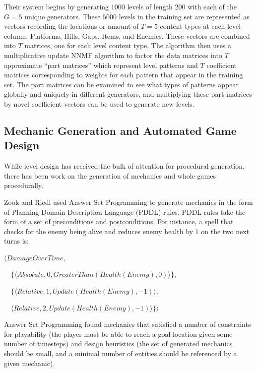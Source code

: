 \documentclass[a4paper]{article}
\begin{document}
Their system begins by generating $1000$ levels of length $200$ with each of the $G=5$ unique generators. These $5000$ levels in the training set are represented as vectors recording the locations or amount of $T=5$ content types at each level column: Platforms, Hills, Gaps, Items, and Enemies. These vectors are combined into $T$ matrices, one for each level content type.  The algorithm then uses a multiplicative update NNMF algorithm \cite{lee1999learning} to factor the data matrices into $T$ approximate ``part matrices'' which represent level patterns and $T$ coefficient matrices corresponding to weights for each pattern that appear in the training set.  The part matrices can be examined to see what types of patterns appear globally and uniquely in different generators, and multiplying these part matrices by novel coefficient vectors can be used to generate new levels. 

\subsection{Mechanic Generation and Automated Game Design}

While level design has received the bulk of attention for procedural generation, there has been work on the generation of mechanics and whole games procedurally.


Zook and Riedl \cite{AGDViaMechanics} used Answer Set Programming to generate mechanics in the form of Planning Domain Description Language (PDDL) rules.  PDDL rules take the form of a set of preconditions and postconditions.  For instance, a spell that checks for the enemy being
alive and reduces enemy health by 1 on the two next turns is:

$\langle DamageOverTime, $

$\quad \{\langle Absolute, 0, GreaterThan(Health(Enemy), 0)\rangle\}, $

$\quad \{\langle Relative, 1, Update(Health(Enemy), −1)\rangle, $

$ \quad  \langle Relative, 2,  Update(Health(Enemy),  −1)\rangle\}\rangle$

Answer Set Programming found mechanics that satisfied a number of constraints for playability (the player must be able to reach a goal location given some number of timesteps) and design heuristics (the set of generated mechanics should be small, and a minimal number of entities should be referenced by a given mechanic).  
\end{document}
